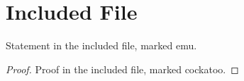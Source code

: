 \section{Included File}

\begin{lemmarep}
  Statement in the included file, marked emu.
\end{lemmarep}

\begin{proof}
  Proof in the included file, marked cockatoo.
\end{proof}
